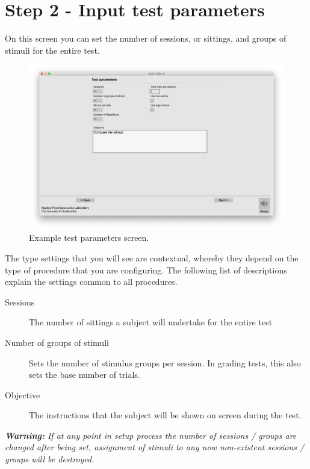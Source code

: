 \section{Step 2 - Input test parameters} 

On this screen you can set the number of sessions, or sittings, and groups of stimuli for the entire test.

\begin{figure}[ht]
	\centering
	\includegraphics[width=1.0\textwidth]{./images/createTest_step03_testSettings.png}
	\caption{Example test parameters screen.}
	\label{create::testSettings}
\end{figure}

The type settings that you will see are contextual, whereby they depend on the type of procedure that you are configuring. The following list of descriptions explain the settings common to all procedures.

\begin{description}
	\item[Sessions] The number of sittings a subject will undertake for the entire test
	\item[Number of groups of stimuli] Sets the number of stimulus groups per session. In grading tests, this also sets the base number of trials.
	\item[Objective] The instructions that the subject will be shown on screen during the test.
\end{description}

\textit{\textbf{Warning:} If at any point in setup process the number of sessions / groups are changed after being set, assignment of stimuli to any now non-existent sessions / groups will be destroyed.}
\pagebreak

